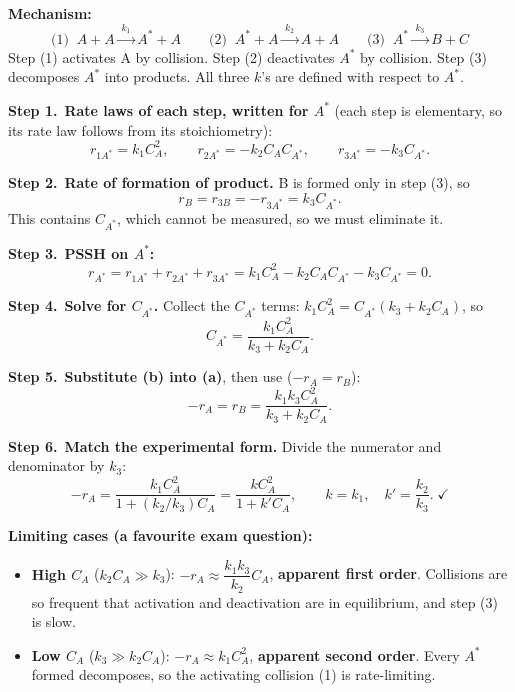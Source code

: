 \documentclass[11pt]{article}
\newcommand{\step}[1]{\par\smallskip\textcolor{stepgray}{\textbf{Step #1.}}\ }
\newcommand{\rxn}[1]{\xrightarrow{\;#1\;}}
\begin{document}
\textbf{Mechanism:}
\[
\text{(1)}\;\; A+A\rxn{k_1}A^*+A \qquad
\text{(2)}\;\; A^*+A\rxn{k_2}A+A \qquad
\text{(3)}\;\; A^*\rxn{k_3}B+C
\]
Step (1) activates A by collision. Step (2) deactivates $A^*$ by collision. Step (3) decomposes $A^*$ into products.
All three $k$'s are defined with respect to $A^*$.

\step{1}\textbf{Rate laws of each step, written for $A^*$} (each step is elementary, so its rate law follows from its stoichiometry):
\[
r_{1A^*}=k_1C_A^2,\qquad r_{2A^*}=-k_2C_AC_{A^*},\qquad r_{3A^*}=-k_3C_{A^*}.
\]
\step{2}\textbf{Rate of formation of product.} B is formed only in step (3), so
\[
r_B=r_{3B}=-r_{3A^*}=k_3C_{A^*}. \tag{a}
\]
This contains $C_{A^*}$, which cannot be measured, so we must eliminate it.

\step{3}\textbf{PSSH on $A^*$:}
\[
r_{A^*}=r_{1A^*}+r_{2A^*}+r_{3A^*}=k_1C_A^2-k_2C_AC_{A^*}-k_3C_{A^*}=0 .
\]
\step{4}\textbf{Solve for $C_{A^*}$.} Collect the $C_{A^*}$ terms: $k_1C_A^2=C_{A^*}(k_3+k_2C_A)$, so
\[
C_{A^*}=\frac{k_1C_A^2}{k_3+k_2C_A}. \tag{b}
\]
\step{5}\textbf{Substitute (b) into (a)}, then use  ($-r_A=r_B$):
\[
-r_A=r_B=\frac{k_1k_3C_A^2}{k_3+k_2C_A}.
\]
\step{6}\textbf{Match the experimental form.} Divide the numerator and denominator by $k_3$:
\[
-r_A=\frac{k_1C_A^2}{1+(k_2/k_3)C_A}=\frac{kC_A^2}{1+k'C_A},\qquad k=k_1,\quad k'=\frac{k_2}{k_3}. \;\checkmark
\]

\textbf{Limiting cases (a favourite exam question):}
\begin{itemize}
\item \textbf{High $C_A$} ($k_2C_A\gg k_3$): $-r_A\approx\dfrac{k_1k_3}{k_2}C_A$, \textbf{apparent first order}.
Collisions are so frequent that activation and deactivation are in equilibrium, and step (3) is slow.
\item \textbf{Low $C_A$} ($k_3\gg k_2C_A$): $-r_A\approx k_1C_A^2$, \textbf{apparent second order}.
Every $A^*$ formed decomposes, so the activating collision (1) is rate-limiting.
\end{itemize}

\begin{center}
\end{center}
\end{document}
